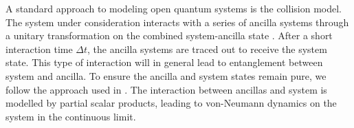 A standard approach to modeling open quantum systems is the collision model.
The system under consideration interacts with a series of ancilla systems through a unitary transformation on the combined system-ancilla state \cite{Lorenzo_2017}. After a short interaction time $\Delta t$, the ancilla systems are traced out to receive the system state.
This type of interaction will in general lead to entanglement between system and ancilla.
To ensure the ancilla and system states remain pure, we follow the approach used in \cite{beyer2020}.
The interaction between ancillas and system is modelled by partial scalar products, leading to von-Neumann dynamics on the system in the continuous limit.